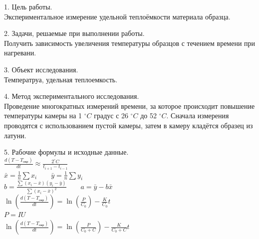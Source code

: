\documentclass[12pt]{article}
\begin{document}
\noindent\makebox[\linewidth]{\rule{\textwidth}{1pt}}
\noindent\makebox[\linewidth]{\rule{\textwidth}{1pt}}

\begin{flushleft}
    1. Цель работы.\\
    \hspace{0.63cm}Экспериментальное измерение удельной теплоёмкости материала образца.
\end{flushleft}

\begin{flushleft}
    2. Задачи, решаемые при выполнении работы.\\
    \hspace{0.63cm} Получить зависимость увеличения температуры образцов с течением времени при нагревани.
\end{flushleft}

\begin{flushleft}
    3. Объект исследования. \\
    Температруа, удельная теплоемкость.
\end{flushleft}

\begin{flushleft}
    4. Метод экспериментального исследования. \\
    \hspace{0.63cm}Проведение многократных измерений времени, за которое происходит повышение температуры
    камеры на 1 $ ^\circ C $ градус с 26 $ ^\circ C $ до 52 $ ^\circ C $. Сначала измерения проводятся с использованием пустой
    камеры, затем в камеру кладётся образец из латуни.
\end{flushleft}

\begin{flushleft}
    5. Рабочие формулы и исходные данные. \\
    $ \frac{d(T - T_{\text{окр}})}{dt} \approx \frac{2^\circ C}{t_{i+1} - t_{i-1}} $ \\
    $ \bar{x} = \frac{1}{n} \sum x_i \qquad \bar{y} = \frac{1}{n} \sum y_i $ \\
    $ b = \frac{\sum(x_i - \bar{x})(y_i - \bar{y})}{\sum(x_i - \bar{x})^2} \qquad a = \bar{y} - b \bar{x} $ \\
    $ \ln\left( \frac{d(T - T_{\text{окр}})}{dt} \right) = \ln\left( \frac{P}{C_0} \right) - \frac{K}{C_0} t $ \\
    $ P = IU $ \\
    $ \ln\left( \frac{d(T - T_{\text{окр}})}{dt} \right) = \ln\left( \frac{P}{C_0 + C} \right) - \frac{K}{C_0 + C} t $ \\
\end{flushleft}
\end{document}
